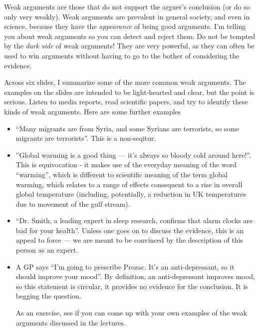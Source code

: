 \documentclass[12pt]{article}
\begin{document}
Weak arguments are those that do not support the arguer's conclusion
(or do so only very weakly). Weak arguments are prevalent in general
society, and even in science, because they have the \emph{appearance}
of being good arguments. I'm telling you about weak arguments so you
can detect and reject them. Do not be tempted by the \emph{dark side}
of weak arguments! They are very powerful, as they can often be used
to win arguments without having to go to the bother of considering the
evidence.

Across six slides, I summarize some of the more common weak
arguments. The examples on the slides are intended to be light-hearted
and clear, but the point is serious. Listen to media reports, read
scientific papers, and try to identify these kinds of weak
arguments. Here are some further examples

\begin{itemize}
\item ``Many migrants are from Syria, and some Syrians are terrorists,
  so some migrants are terrorists''. This is a non-seqitur.

\item ''Global warming is a good thing --- it's always so bloody cold
  around here!''. This is equivocation - it makes use of the everyday
  meaning of the word ``warming'', which is different to scientific
  meaning of the term global warming, which relates to a range of
  effects consequent to a rise in overall global temperature
  (including, potentially, a reduction in UK temperatures due to
  movement of the gulf stream).

\item ``Dr. Smith, a leading expert in sleep research, confirms that
  alarm clocks are bad for your health''. Unless one goes on to
  discuss the evidence, this is an appeal to force --- we are meant to
  be convinced by the description of this person as an expert.

\item A GP says ``I'm going to prescribe Prozac. It's an
  anti-depressant, so it should improve your mood''. By definition, an
  anti-depressant improves mood, so this statement is circular, it
  provides no evidence for the conclusion. It is begging the question.

  As an exercise, see if you can come up with your own examples of the
  weak arguments discussed in the lectures. 

\end{itemize}
\end{document}
